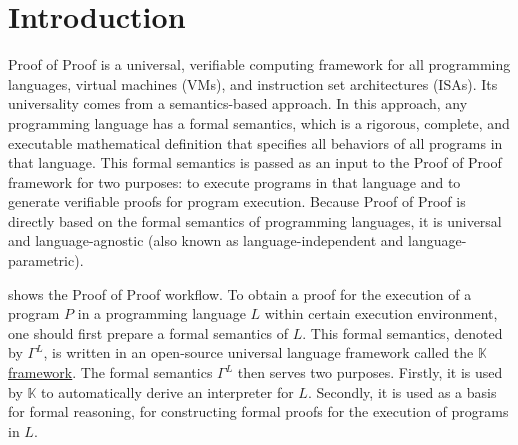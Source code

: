 \documentclass{article}
\theoremstyle{plain}
\theoremstyle{definition}
\newcommand{\K}{$\mathbb{K}$\xspace}
\begin{document}
\newpage

\renewcommand{\contentsname}{Table of Contents}
\tableofcontents


\newpage

\section{Introduction}

Proof of Proof is a universal, verifiable computing framework for all programming languages,
virtual machines (VMs), and instruction set architectures (ISAs). 
Its universality comes from a semantics-based approach.
In this approach, any programming language has a formal semantics, 
which is a rigorous, complete, and executable mathematical definition
that specifies all behaviors of all programs in that language. 
This formal semantics is passed as an input to the Proof of Proof framework for two purposes:
to execute programs in that language and to generate verifiable proofs for program execution. 
Because Proof of Proof is directly based on the formal semantics of programming languages,
it is universal and language-agnostic (also known as language-independent and language-parametric). 


 shows the Proof of Proof workflow.
To obtain a proof for the execution of a program $P$ in a programming language $L$
within certain execution environment,
one should first prepare a formal semantics of $L$. 
This formal semantics, denoted by $\Gamma^L$, is written in an open-source universal language framework
called the \href{https://kframework.org}{\K framework}. 
The formal semantics $\Gamma^L$ then serves two purposes. 
Firstly, it is used by \K to automatically derive an interpreter for $L$. 
Secondly, it is used as a basis for formal reasoning, for constructing formal proofs
for the execution of programs in $L$.  
\end{document}
